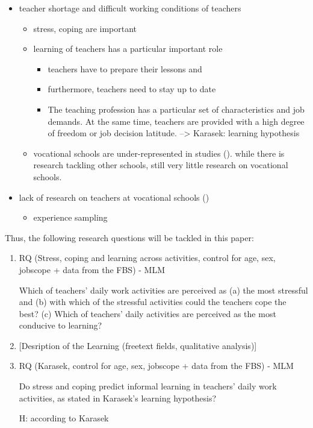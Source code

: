 \documentclass[
]{article}
\providecommand{\tightlist}{%
  \setlength{\itemsep}{0pt}\setlength{\parskip}{0pt}}
\begin{document}
\begin{itemize}
\item
  teacher shortage and difficult working conditions of teachers

  \begin{itemize}
  \item
    stress, coping are important
  \item
    learning of teachers has a particular important role

    \begin{itemize}
    \item
      teachers have to prepare their lessons and
    \item
      furthermore, teachers need to stay up to date
    \item
      The teaching profession has a particular set of characteristics
      and job demands. At the same time, teachers are provided with a
      high degree of freedom or job decision latitude. --\textgreater{}
      Karasek: learning hypothesis
    \end{itemize}
  \item
    vocational schools are under-represented in studies (). while there
    is research tackling other schools, still very little research on
    vocational schools.
  \end{itemize}
\item
  lack of research on teachers at vocational schools ()

  \begin{itemize}
  \tightlist
  \item
    experience sampling
  \end{itemize}
\end{itemize}

Thus, the following research questions will be tackled in this paper:

\begin{enumerate}
\def\labelenumi{\arabic{enumi}.}
\item
  RQ (Stress, coping and learning across activities, control for age,
  sex, jobscope + data from the FBS) - MLM

  Which of teachers' daily work activities are perceived as (a) the most
  stressful and (b) with which of the stressful activities could the
  teachers cope the best? (c) Which of teachers' daily activities are
  perceived as the most conducive to learning?
\item
  {[}Desription of the Learning (freetext fields, qualitative
  analysis){]}
\item
  RQ (Karasek, control for age, sex, jobscope + data from the FBS) - MLM

  Do stress and coping predict informal learning in teachers' daily work
  activities, as stated in Karasek's learning hypothesis?

  H: according to Karasek
\end{enumerate}
\end{document}
